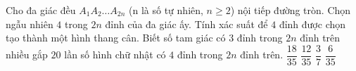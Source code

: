 \begin{bt}%
	Cho đa giác đều $A_1A_2\ldots A_{2n}$ (n là số tự nhiên, $n \ge 2$) nội tiếp đường tròn. Chọn ngẫu nhiên $4$ trong $2n$ đỉnh của đa giác ấy. Tính xác suất để $4$ đỉnh được chọn tạo thành một hình thang cân. Biết số tam giác có $3$ đỉnh trong $2n$ đỉnh trên nhiều gắp $20$ lần số hình chữ nhật có $4$ đỉnh trong $2n$ đỉnh trên.
	\choice
	{$\dfrac{18}{35}$}
	{$\dfrac{12}{35}$}
	{\True $\dfrac{3}{7}$}
	{$\dfrac{6}{35}$}
\end{bt}

